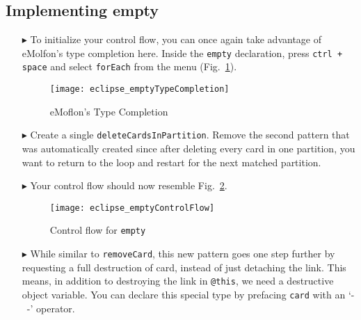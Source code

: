 \newpage
\hypertarget{emptyPartition tex}{}
\subsection{Implementing empty}
\texHeader

\begin{itemize}
 
\item[$\blacktriangleright$] To initialize your control flow, you can once again take advantage of eMolfon's type completion here. Inside the \texttt{empty}
declaration, press  \texttt{ctrl + space} and select \texttt{forEach} from the menu (Fig.~\ref{fig:typeCompletion}).

\vspace{0.5cm}

\begin{figure}[htpb]
\begin{center}
  \texttt{[image: eclipse\_emptyTypeCompletion]}
  \caption{eMoflon's Type Completion}
  \label{fig:typeCompletion}
\end{center}
\end{figure}

\vspace{0.5cm}

\item[$\blacktriangleright$] Create a single \texttt{deleteCardsInPartition}. Remove the second pattern that was automatically created since after deleting
every card in one partition, you want to return to the loop and restart for the next matched partition.

\vspace{0.5cm}

\item[$\blacktriangleright$] Your control flow should now resemble Fig.~\ref{fig:emptyControlFlow}.

\clearpage

\begin{figure}[htpb]
\begin{center}
  \texttt{[image: eclipse\_emptyControlFlow]}
  \caption{Control flow for \texttt{empty}}
  \label{fig:emptyControlFlow}
\end{center}
\end{figure}

\item[$\blacktriangleright$] While similar to \texttt{removeCard}, this new pattern goes one step further by requesting a full destruction of card, instead of
just detaching the link. This means, in addition to destroying the link in \texttt{@this}, we need a destructive object variable. You can declare this special
type by prefacing \texttt{card} with an `-~-' operator.


\end{itemize}
